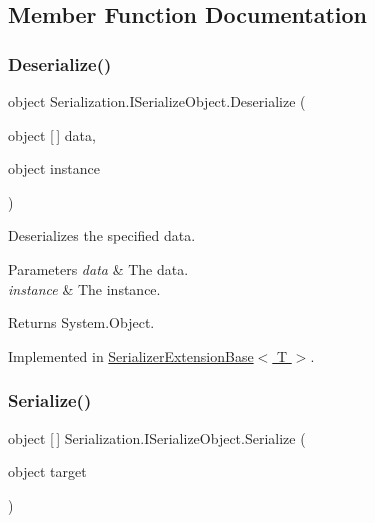 \subsection{Member Function Documentation}
\mbox{\label{interface_serialization_1_1_i_serialize_object_a100975fc581fdc4e4d29759daef4b99e}} 
\subsubsection{\texorpdfstring{Deserialize()}{Deserialize()}}
{\footnotesize\ttfamily object Serialization.\+I\+Serialize\+Object.\+Deserialize (\begin{DoxyParamCaption}\item[{object \mbox{[}$\,$\mbox{]}}]{data,  }\item[{object}]{instance }\end{DoxyParamCaption})}



Deserializes the specified data. 


\begin{DoxyParams}{Parameters}
{\em data} & The data.\\
\hline
{\em instance} & The instance.\\
\hline
\end{DoxyParams}
\begin{DoxyReturn}{Returns}
System.\+Object.
\end{DoxyReturn}


Implemented in \hyperlink{class_serializer_extension_base_a04524500adb2abafdb0e606148145e07}{Serializer\+Extension\+Base$<$ T $>$}.

\mbox{\label{interface_serialization_1_1_i_serialize_object_a4e84ab8859d2e9921ee7d4d0eda0da97}} 
\subsubsection{\texorpdfstring{Serialize()}{Serialize()}}
{\footnotesize\ttfamily object \mbox{[}$\,$\mbox{]} Serialization.\+I\+Serialize\+Object.\+Serialize (\begin{DoxyParamCaption}\item[{object}]{target }\end{DoxyParamCaption})}



